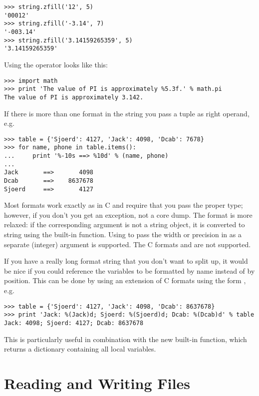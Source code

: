 \documentclass{manual}
\begin{document}
\begin{verbatim}
>>> string.zfill('12', 5)
'00012'
>>> string.zfill('-3.14', 7)
'-003.14'
>>> string.zfill('3.14159265359', 5)
'3.14159265359'
\end{verbatim}
%
Using the \code{\%} operator looks like this:

\begin{verbatim}
>>> import math
>>> print 'The value of PI is approximately %5.3f.' % math.pi
The value of PI is approximately 3.142.
\end{verbatim}

If there is more than one format in the string you pass a tuple as
right operand, e.g.

\begin{verbatim}
>>> table = {'Sjoerd': 4127, 'Jack': 4098, 'Dcab': 7678}
>>> for name, phone in table.items():
...     print '%-10s ==> %10d' % (name, phone)
... 
Jack       ==>       4098
Dcab       ==>    8637678
Sjoerd     ==>       4127
\end{verbatim}

Most formats work exactly as in C and require that you pass the proper
type; however, if you don't you get an exception, not a core dump.
The  format is more relaxed: if the corresponding argument is
not a string object, it is converted to string using the
 built-in function.  Using \code{*} to pass the width
or precision in as a separate (integer) argument is supported.  The
C formats  and  are not supported.

If you have a really long format string that you don't want to split
up, it would be nice if you could reference the variables to be
formatted by name instead of by position.  This can be done by using
an extension of C formats using the form , e.g.

\begin{verbatim}
>>> table = {'Sjoerd': 4127, 'Jack': 4098, 'Dcab': 8637678}
>>> print 'Jack: %(Jack)d; Sjoerd: %(Sjoerd)d; Dcab: %(Dcab)d' % table
Jack: 4098; Sjoerd: 4127; Dcab: 8637678
\end{verbatim}

This is particularly useful in combination with the new built-in
 function, which returns a dictionary containing all
local variables.

\section{Reading and Writing Files \label{files}}
\end{document}
